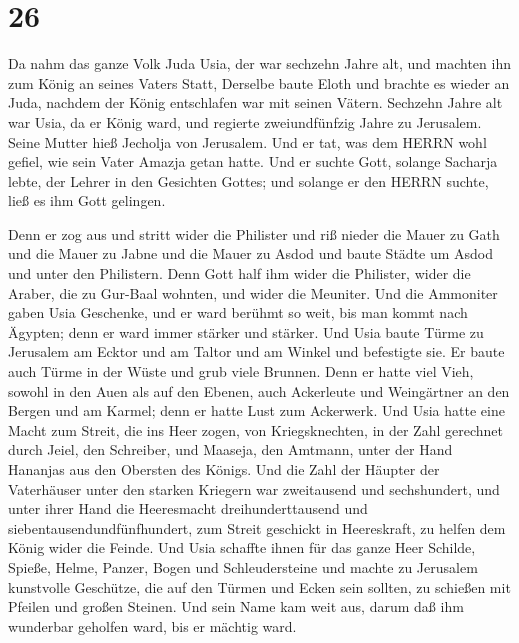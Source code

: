 \hypertarget{section-25}{%
\section{26}\label{section-25}}

 Da nahm das ganze Volk Juda Usia, der war sechzehn Jahre
alt, und machten ihn zum König an seines Vaters Statt, 
Derselbe baute Eloth und brachte es wieder an Juda, nachdem der König
entschlafen war mit seinen Vätern.  Sechzehn Jahre alt war
Usia, da er König ward, und regierte zweiundfünfzig Jahre zu Jerusalem.
Seine Mutter hieß Jecholja von Jerusalem.  Und er tat, was
dem HERRN wohl gefiel, wie sein Vater Amazja getan hatte. 
Und er suchte Gott, solange Sacharja lebte, der Lehrer in den Gesichten
Gottes; und solange er den HERRN suchte, ließ es ihm Gott gelingen.

 Denn er zog aus und stritt wider die Philister und riß
nieder die Mauer zu Gath und die Mauer zu Jabne und die Mauer zu Asdod
und baute Städte um Asdod und unter den Philistern.  Denn
Gott half ihm wider die Philister, wider die Araber, die zu Gur-Baal
wohnten, und wider die Meuniter.  Und die Ammoniter gaben
Usia Geschenke, und er ward berühmt so weit, bis man kommt nach Ägypten;
denn er ward immer stärker und stärker.  Und Usia baute
Türme zu Jerusalem am Ecktor und am Taltor und am Winkel und befestigte
sie.  Er baute auch Türme in der Wüste und grub viele
Brunnen. Denn er hatte viel Vieh, sowohl in den Auen als auf den Ebenen,
auch Ackerleute und Weingärtner an den Bergen und am Karmel; denn er
hatte Lust zum Ackerwerk.  Und Usia hatte eine Macht zum
Streit, die ins Heer zogen, von Kriegsknechten, in der Zahl gerechnet
durch Jeiel, den Schreiber, und Maaseja, den Amtmann, unter der Hand
Hananjas aus den Obersten des Königs.  Und die Zahl der
Häupter der Vaterhäuser unter den starken Kriegern war zweitausend und
sechshundert,  und unter ihrer Hand die Heeresmacht
dreihunderttausend und siebentausendundfünfhundert, zum Streit geschickt
in Heereskraft, zu helfen dem König wider die Feinde.  Und
Usia schaffte ihnen für das ganze Heer Schilde, Spieße, Helme, Panzer,
Bogen und Schleudersteine  und machte zu Jerusalem
kunstvolle Geschütze, die auf den Türmen und Ecken sein sollten, zu
schießen mit Pfeilen und großen Steinen. Und sein Name kam weit aus,
darum daß ihm wunderbar geholfen ward, bis er mächtig ward.

